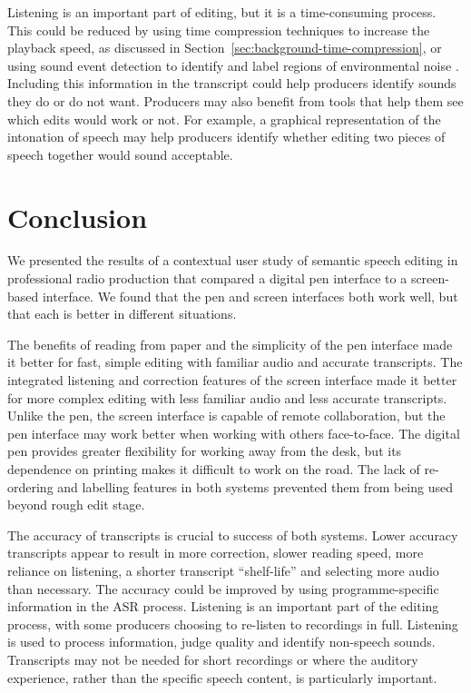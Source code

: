 Listening is an important part of editing, but it is a time-consuming process. This could be reduced by using time
compression techniques to increase the playback speed, as discussed in Section~\ref{sec:background-time-compression},
or using sound event detection to identify and label regions of environmental noise \citep{Duan2014,Kroos2017}.
Including this information in the transcript could help producers identify sounds they do or do not want.  Producers
may also benefit from tools that help them see which edits would work or not.  For example, a graphical representation
of the intonation of speech may help producers identify whether editing two pieces of speech together would sound
acceptable.

\section{Conclusion}\label{sec:paper-conclusion}
We presented the results of a contextual user study of semantic speech editing in professional radio production that
compared a digital pen interface to a screen-based interface.  We found that the pen and screen interfaces both work
well, but that each is better in different situations.

The benefits of reading from paper and the simplicity of the pen interface made it better for fast, simple editing with
familiar audio and accurate transcripts.  The integrated listening and correction features of the screen interface made
it better for more complex editing with less familiar audio and less accurate transcripts.  Unlike the pen, the screen
interface is capable of remote collaboration, but the pen interface may work better when working with others
face-to-face.  The digital pen provides greater flexibility for working away from the desk, but its dependence on
printing makes it difficult to work on the road.  The lack of re-ordering and labelling features in both systems
prevented them from being used beyond rough edit stage.

The accuracy of transcripts is crucial to success of both systems. Lower accuracy transcripts appear to result in more
correction, slower reading speed, more reliance on listening, a shorter transcript ``shelf-life'' and selecting more
audio than necessary. The accuracy could be improved by using programme-specific information in the ASR process.
Listening is an important part of the editing process, with some producers choosing to re-listen to recordings in full.
Listening is used to process information, judge quality and identify non-speech sounds. Transcripts may not be needed
for short recordings or where the auditory experience, rather than the specific speech content, is particularly
important.

